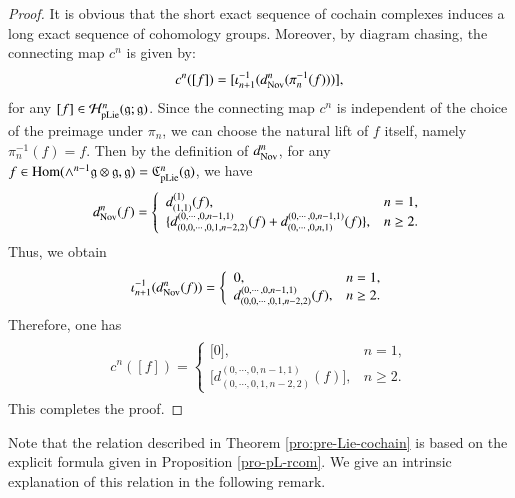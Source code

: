 \documentclass[12pt]{amsart}
\theoremstyle{definition}
\newcommand{\g}{\mathfrak g}
\newcommand{\huaH}{\mathcal{H}}
\newcommand{\frkC}{\mathfrak C}
\newcommand{\Hom}{\mathrm{Hom}}
\newcommand{\ot}{\otimes}
\newcommand{\nov}{{\rm Nov}}
\newcommand{\pl}{{\rm pLie}}
\begin{document}
\begin{proof}
It is obvious that the short exact sequence of cochain complexes induces a long exact sequence of cohomology groups. Moreover, by diagram chasing, the connecting map $c^n$ is given by:
\begin{align*}
	c^n([f])= [\iota_{n+1}^{-1}( d_\nov^n( \pi_n^{-1}(f)  ) )],
\end{align*}
for any $[f]\in \huaH^n_\pl(\g;\g)$.
Since the connecting map $c^n$ is independent of the choice of the preimage under $\pi_n$, we can choose the natural lift of $f$ itself, namely $\pi_n^{-1}(f)=f$.
Then by the definition of $d_\nov^n$, for any $f\in \Hom(\wedge^{n-1}\g\ot\g,\g)=\frkC_\pl^n(\g)$, we have
\begin{align*}
\begin{split}
d_\nov^n(f)= \left \{
\begin{array}{ll}
	d_{(1,1)}^{(1)}(f),                    & n=1,\\
	\{d_{(0,0,\cdots,0,1,n-2,2)}^{(0,\cdots,0,n-1,1)}(f)+d_{(0,\cdots,0,n,1)}^{(0,\cdots,0,n-1,1)}(f) \},     & n\geq 2.
\end{array}
\right.
\end{split}
\end{align*}
Thus, we obtain
\begin{align*}
	\begin{split}
		\iota_{n+1}^{-1}(d_\nov^n(f))= \left \{
		\begin{array}{ll}
			0,                    & n=1,\\
			d_{(0,0,\cdots,0,1,n-2,2)}^{(0,\cdots,0,n-1,1)}(f),     & n\geq 2.
		\end{array}
		\right.
	\end{split}
\end{align*}
Therefore, one has
\begin{align*}
	\begin{split}
		c^n([f])= \left \{
		\begin{array}{ll}
			{[}0],                    & n=1,\\
			{[}d_{(0,\cdots,0,1,n-2,2)}^{(0,\cdots,0,n-1,1)}(f)],     & n\geq 2.
		\end{array}
		\right.
	\end{split}
\end{align*}
This completes the proof.
\end{proof}




Note that the relation described in Theorem \ref{pro:pre-Lie-cochain} is based on the explicit formula given in Proposition \ref{pro-pL-rcom}. We give an intrinsic explanation of this relation in the following remark.
\end{document}
